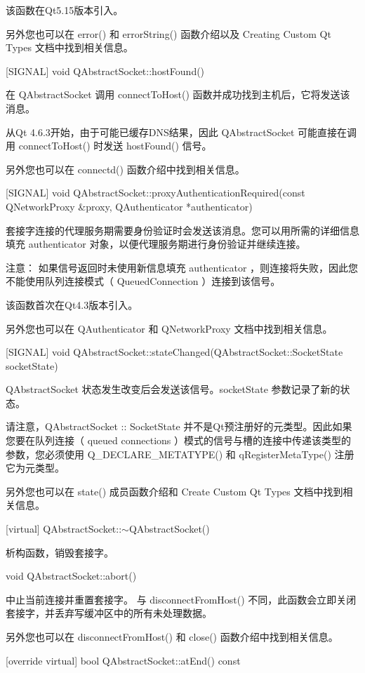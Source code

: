 该函数在Qt5.15版本引入。

另外您也可以在 error() 和 errorString() 函数介绍以及 Creating Custom Qt Types 文档中找到相关信息。

[SIGNAL] void QAbstractSocket::hostFound()

在 QAbstractSocket 调用 connectToHost() 函数并成功找到主机后，它将发送该消息。

\begin{notice}
从Qt 4.6.3开始，由于可能已缓存DNS结果，因此 QAbstractSocket 可能直接在调用 connectToHost() 时发送 hostFound() 信号。
\end{notice}

另外您也可以在 connectd() 函数介绍中找到相关信息。

[SIGNAL] void QAbstractSocket::proxyAuthenticationRequired(const
QNetworkProxy \&proxy, QAuthenticator *authenticator)

套接字连接的代理服务期需要身份验证时会发送该消息。您可以用所需的详细信息填充 authenticator 对象，以便代理服务期进行身份验证并继续连接。

注意： 如果信号返回时未使用新信息填充 authenticator ，则连接将失败，因此您不能使用队列连接模式（ QueuedConnection ）连接到该信号。

该函数首次在Qt4.3版本引入。

另外您也可以在 QAuthenticator 和 QNetworkProxy 文档中找到相关信息。

[SIGNAL] void
QAbstractSocket::stateChanged(QAbstractSocket::SocketState
socketState)

QAbstractSocket 状态发生改变后会发送该信号。socketState 参数记录了新的状态。

请注意，QAbstractSocket :: SocketState 并不是Qt预注册好的元类型。因此如果您要在队列连接（ queued connections ）模式的信号与槽的连接中传递该类型的参数，您必须使用 Q\_DECLARE\_METATYPE() 和 qRegisterMetaType() 注册它为元类型。

另外您也可以在 state() 成员函数介绍和 Create Custom Qt Types 文档中找到相关信息。

[virtual] QAbstractSocket::$\sim$QAbstractSocket()

析构函数，销毁套接字。

void QAbstractSocket::abort()

中止当前连接并重置套接字。 与 disconnectFromHost() 不同，此函数会立即关闭套接字，并丢弃写缓冲区中的所有未处理数据。

另外您也可以在 disconnectFromHost() 和 close() 函数介绍中找到相关信息。

[override virtual] bool QAbstractSocket::atEnd() const

